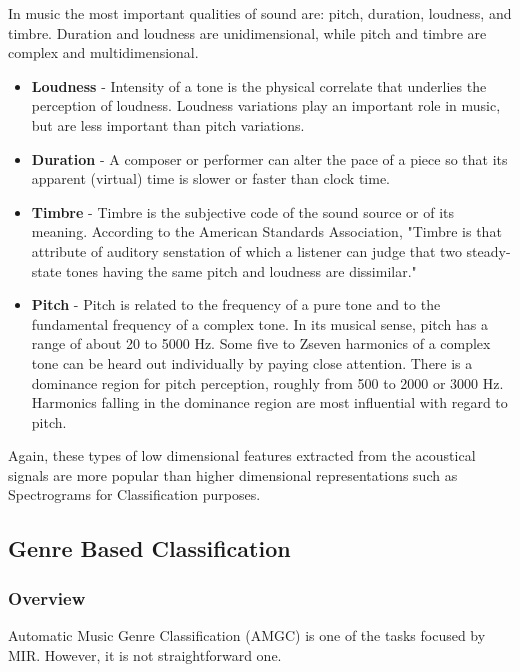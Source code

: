 In music the most important qualities of sound are: pitch, duration, loudness, and timbre. Duration and loudness are unidimensional, while pitch and timbre are complex and multidimensional. \cite{dooling2014}

\begin{itemize}
        \item \textbf{Loudness} - Intensity of a tone is the physical correlate that underlies the perception of loudness. Loudness variations play an important role in music, but are less important than pitch variations.

        \item \textbf{Duration} - A composer or performer can alter the pace of a piece so that its apparent (virtual) time is slower or faster than clock time. 

        \item \textbf{Timbre} - Timbre is the subjective code of the sound source or of its meaning. According to the American Standards Association, "Timbre
                is that attribute of auditory senstation of which a listener can judge that two steady-state tones having the same pitch and loudness are dissimilar."

        \item \textbf{Pitch} - Pitch is related to the frequency of a pure tone and to the fundamental frequency of a complex tone. In its musical sense, pitch
                has a range of about 20 to 5000 Hz. Some five to Zseven harmonics of a complex tone can be heard out individually by paying close attention. There
                is a dominance region for pitch perception, roughly from 500 to 2000 or 3000 Hz. Harmonics falling in the dominance region are most influential 
                with regard to pitch.

\end{itemize}

Again, these types of low dimensional features extracted from the acoustical signals are more popular than higher dimensional representations such as
Spectrograms for Classification purposes. \cite{prasad2007}

\subsection{Genre Based Classification}

\subsubsection{Overview}
Automatic Music Genre Classification (AMGC) is one of the tasks focused by MIR. However, it is not straightforward one.

